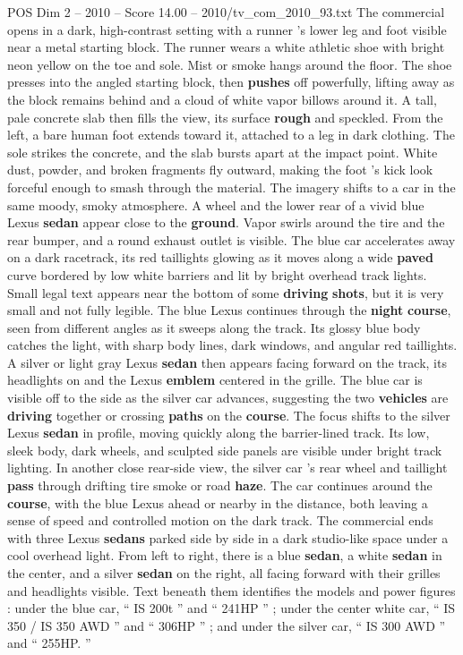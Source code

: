 \begin{textsample}{POS Dim 2 – 2010 – Score 14.00 – 2010/tv\_com\_2010\_93.txt}  \label{ex:f2_pos_058}
The commercial opens in a dark, high-contrast setting with a runner ’s lower leg and foot visible near a metal starting block.
The runner wears a white athletic shoe with bright neon yellow on the toe and sole.
Mist or smoke hangs around the floor.
The shoe presses into the angled starting block, then \textbf{pushes} off powerfully, lifting away as the block remains behind and a cloud of white vapor billows around it.
A tall, pale concrete slab then fills the view, its surface \textbf{rough} and speckled.
From the left, a bare human foot extends toward it, attached to a leg in dark clothing.
The sole strikes the concrete, and the slab bursts apart at the impact point.
White dust, powder, and broken fragments fly outward, making the foot ’s kick look forceful enough to smash through the material.
The imagery shifts to a car in the same moody, smoky atmosphere.
A wheel and the lower rear of a vivid blue Lexus \textbf{sedan} appear close to the \textbf{ground}.
Vapor swirls around the tire and the rear bumper, and a round exhaust outlet is visible.
The blue car accelerates away on a dark racetrack, its red taillights glowing as it moves along a wide \textbf{paved} curve bordered by low white barriers and lit by bright overhead track lights.
Small legal text appears near the bottom of some \textbf{driving} \textbf{shots}, but it is very small and not fully legible.
The blue Lexus continues through the \textbf{night} \textbf{course}, seen from different angles as it sweeps along the track.
Its glossy blue body catches the light, with sharp body lines, dark windows, and angular red taillights.
A silver or light gray Lexus \textbf{sedan} then appears facing forward on the track, its headlights on and the Lexus \textbf{emblem} centered in the grille.
The blue car is visible off to the side as the silver car advances, suggesting the two \textbf{vehicles} are \textbf{driving} together or crossing \textbf{paths} on the \textbf{course}.
The focus shifts to the silver Lexus \textbf{sedan} in profile, moving quickly along the barrier-lined track.
Its low, sleek body, dark wheels, and sculpted side panels are visible under bright track lighting.
In another close rear-side view, the silver car ’s rear wheel and taillight \textbf{pass} through drifting tire smoke or road \textbf{haze}.
The car continues around the \textbf{course}, with the blue Lexus ahead or nearby in the distance, both leaving a sense of speed and controlled motion on the dark track.
The commercial ends with three Lexus \textbf{sedans} parked side by side in a dark studio-like space under a cool overhead light.
From left to right, there is a blue \textbf{sedan}, a white \textbf{sedan} in the center, and a silver \textbf{sedan} on the right, all facing forward with their grilles and headlights visible.
Text beneath them identifies the models and power figures : under the blue car, “ IS 200t ” and “ 241HP ” ; under the center white car, “ IS 350 / IS 350 AWD ” and “ 306HP ” ; and under the silver car, “ IS 300 AWD ” and “ 255HP. ”

\end{textsample}
